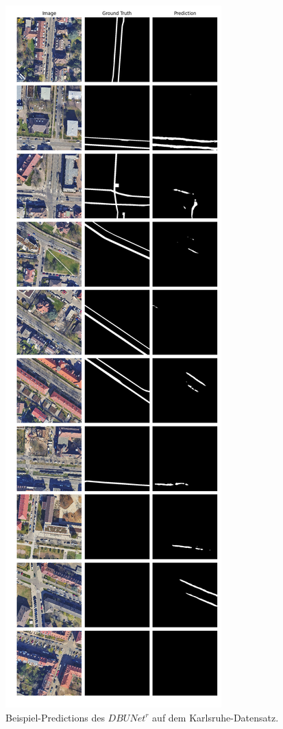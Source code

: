 \begin{figure}
	\centering
	\includegraphics[width=.41\textwidth]{Bilder/Samples-KA/dbunet-r.png} 
	\caption{Beispiel-Predictions des $DBUNet^r$ auf dem Karlsruhe-Datensatz.}
	\label{fig:ka-samples-dbunet-r}
\end{figure}

